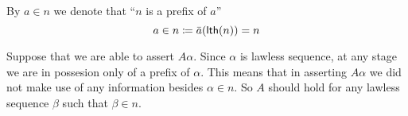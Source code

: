\documentclass[11pt]{article}
\begin{document}
\begin{notation}
  By $a \in n$ we denote that ``$n$ is a prefix of $a$''
  \[ a \in n \coloneqq \bar{a}(\mathsf{lth}(n)) = n \]
\end{notation}

Suppose that we are able to assert $A\alpha$. Since $\alpha$ is lawless
sequence, at any stage we are in possesion only of a prefix of $\alpha$. This
means that in asserting $A\alpha$ we did not make use of any information
besides  $\alpha \in n$. So $A$ should hold for any lawless sequence $\beta$
such that $\beta \in n$.



\end{document}
